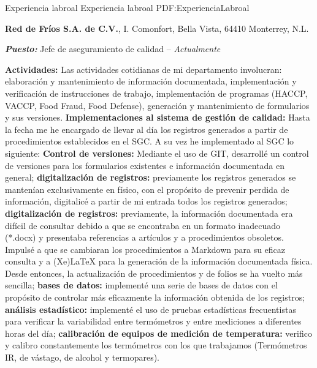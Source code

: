 \Section
{Experiencia labroal}
{Experiencia labroal}
{PDF:ExperienciaLabroal}



\Entry
{\textbf{Red de Fríos S.A. de C.V.}},
\newline
I. Comonfort, Bella Vista, 64410 Monterrey, N.L.

\Gap
\BulletItem
\textbf{\textit{Puesto:}} Jefe de aseguramiento de calidad
\hfill
{} -- \textit{Actualmente}
\Gap
\begin{Detail}
\BulletItem \textbf{Actividades:}
    Las actividades cotidianas de mi departamento involucran: \compac elaboración y mantenimiento de información documentada, implementación y verificación de instrucciones de trabajo, implementación de programas (HACCP, VACCP, Food Fraud, Food Defense), generación y mantenimiento de formularios y sus versiones.
\Gap
    \BulletItem \textbf{Implementaciones al sistema de gestión de calidad:}
    Hasta la fecha me he encargado de llevar al día los registros generados a partir de procedimientos establecidos en el SGC. A su vez he implementado al SGC lo siguiente:
    \SubBulletItem
        \textbf{Control de versiones:} Mediante el uso de GIT, desarrollé un control de versiones para los formularios existentes e información documentada en general; 
    \SubBulletItem
        \textbf{digitalización de registros:} previamente los registros generados se mantenían exclusivamente en físico, con el propósito de prevenir perdida de información, digitalicé a partir de mi entrada todos los registros generados;
    \SubBulletItem
        \textbf{digitalización de registros:} previamente, la información documentada era difícil de consultar debido a que se encontraba en un formato inadecuado (*.docx) y presentaba referencias a artículos y a procedimientos obsoletos. Impulsé a que se cambiaran los procedimientos a Markdown para su eficaz consulta y a (Xe)LaTeX para la generación de la información documentada física. Desde entonces, la actualización de procedimientos y de folios se ha vuelto más sencilla;
    \SubBulletItem
        \textbf{bases de datos:} implementé una serie de bases de datos con el propósito de controlar más eficazmente la información obtenida de los registros;
    \SubBulletItem
        \textbf{análisis estadístico:} implementé el uso de pruebas estadísticas frecuentistas para verificar la variabilidad entre termómetros y entre mediciones a diferentes horas del día;
    \SubBulletItem
        \textbf{calibración de equipos de medición de temperatura:} verifico y calibro constantemente los termómetros con los que trabajamos (Termómetros IR, de vástago, de alcohol y termopares).    
\end{Detail}
